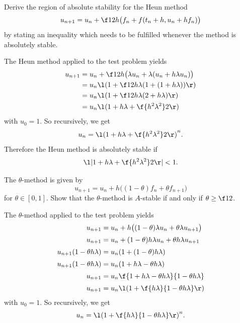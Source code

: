 \documentclass[a4paper]{article}
\begin{document}





\begin{questionbody}
Derive the region of absolute stability for the Heun method \[
u_{n+1} = u_n + \f12 h \big( f_n + f(t_n + h, u_n + h f_n) \big)
\] by stating an inequality which needs to be fulfilled whenever the method is absolutely stable.
\end{questionbody}

The Heun method applied to the test problem yields
\begin{align*}
u_{n+1} &= u_n + \f12 h \big( \lambda u_n + \lambda (u_n + h \lambda u_n) \big) \\
&= u_n \l( 1 + \f12 h \lambda (1 + (1 + h \lambda)) \r) \\
&= u_n \l( 1 + \f12 h \lambda (2 + h \lambda) \r) \\
&= u_n \l( 1 + h \lambda + \f{h^2 \lambda^2}2 \r)
\end{align*}
with $u_0 = 1$. So recursively, we get \[
u_n = {\l( 1 + h \lambda + \f{h^2 \lambda^2}2 \r)}^n.
\] Therefore the Heun method is absolutely stable if \[
\l| 1 + h \lambda + \f{h^2 \lambda^2}2 \r| < 1.
\]



\begin{questionbody}
The $\theta$-method is given by \[
u_{n+1} = u_n + h \big( (1 - \theta) f_n + \theta f_{n+1} \big)
\] for $\theta \in [0, 1]$. Show that the $\theta$-method is $A$-stable if and only if $\theta \ge \f12$.
\end{questionbody}

The $\theta$-method applied to the test problem yields
\begin{align*}
u_{n+1} &= u_n + h \big( (1 - \theta) \lambda u_n + \theta \lambda u_{n+1} \big) \\[0.5ex]
u_{n+1} &= u_n + (1 - \theta) h \lambda u_n + \theta h \lambda u_{n+1} \\[0.5ex]
u_{n+1} (1 - \theta h \lambda) &= u_n (1 + (1 - \theta) h \lambda) \\[0.5ex]
u_{n+1} (1 - \theta h \lambda) &= u_n (1 + h \lambda - \theta h \lambda) \\[0.5ex]
u_{n+1} &= u_n \f{1 + h \lambda - \theta h \lambda}{1 - \theta h \lambda} \\[0.5ex]
u_{n+1} &= u_n \l( 1 + \f{h \lambda}{1 - \theta h \lambda} \r)
\end{align*}
with $u_0 = 1$. So recursively, we get \[
u_n = {\l( 1 + \f{h \lambda}{1 - \theta h \lambda} \r)}^n.
\]
\end{document}

